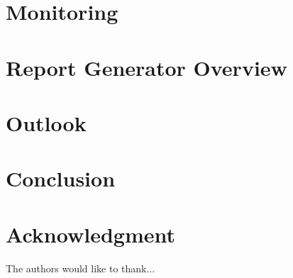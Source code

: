 \documentclass[journal]{IEEEtran}
\begin{document}
\section{Monitoring}







\section{Report Generator Overview}



\section{Outlook}




\section{Conclusion}






\section*{Acknowledgment}

The authors would like to thank...





\printbibliography
\end{document}
